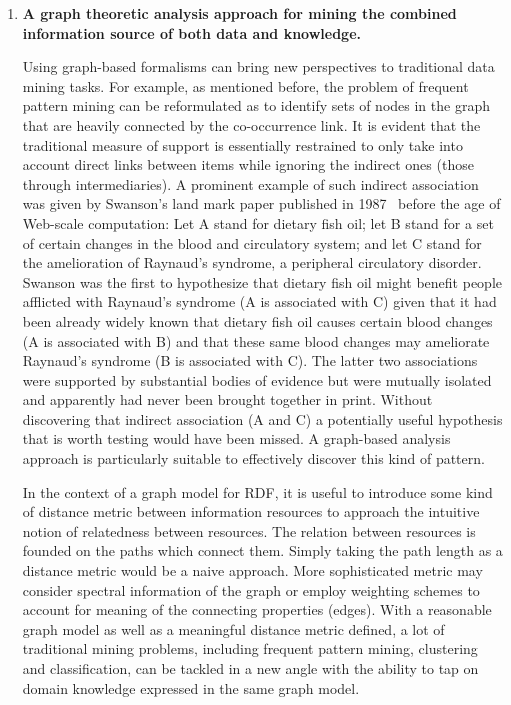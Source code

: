 \begin{enumerate}
\item \textbf{A graph theoretic analysis approach for mining the combined information source of both data and knowledge.}

    Using graph-based formalisms can bring new perspectives to traditional data mining tasks. For example, as mentioned before, the problem of frequent pattern mining can be reformulated as to identify sets of nodes in the graph that are heavily connected by the co-occurrence link. It is evident that the traditional measure of support is essentially restrained to only take into account direct links between items while ignoring the indirect ones (those through intermediaries). A prominent example of such indirect association was given by Swanson's land mark paper published in 1987~\cite{swanson87} before the age of Web-scale computation:
    Let A stand for dietary fish oil; let B stand for a set of certain changes in the blood and circulatory system; and let C stand for the amelioration of Raynaud's syndrome, a peripheral circulatory disorder. Swanson was the first to hypothesize that dietary fish oil might benefit people afflicted with Raynaud's syndrome (A is associated with C) given that it had been already widely known that dietary fish oil causes certain blood changes (A is associated with B) and that these same blood changes may ameliorate Raynaud's syndrome (B is associated with C). The latter two associations were supported by substantial bodies of evidence but were mutually isolated and apparently had never been brought together in print. Without discovering that indirect association (A and C) a potentially useful hypothesis that is worth testing would have been missed. A graph-based analysis approach is particularly suitable to effectively discover this kind of pattern.

    In the context of a graph model for RDF, it is useful to introduce some kind of distance metric between information resources to approach the intuitive notion of relatedness between resources. The relation between resources is founded on the paths which connect them. Simply taking the path length as a distance metric would be a naive approach. More sophisticated metric may consider spectral information of the graph or employ weighting schemes to account for meaning of the connecting properties (edges). With a reasonable graph model as well as a meaningful distance metric defined, a lot of traditional mining problems, including frequent pattern mining, clustering and classification, can be tackled in a new angle with the ability to tap on domain knowledge expressed in the same graph model.


\end{enumerate}
